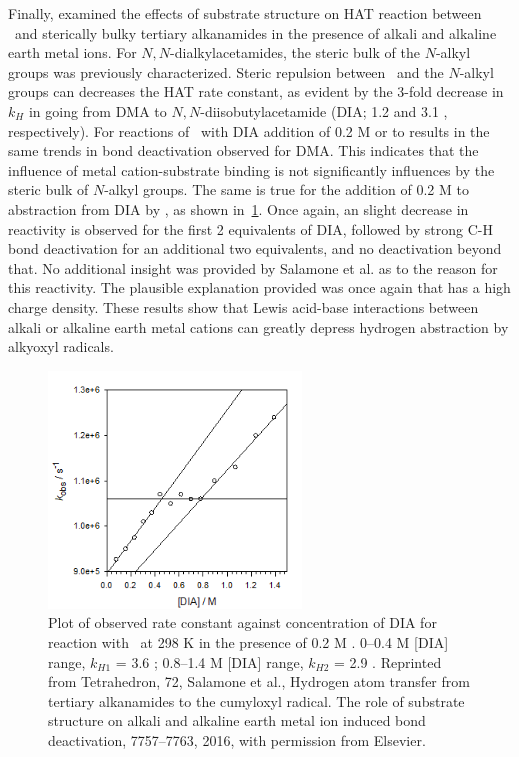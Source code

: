 Finally, \citet{Salamone2016} examined the effects of substrate structure on
HAT reaction between \cumo\ and sterically bulky tertiary alkanamides in the
presence of alkali and alkaline earth metal ions. For $N,N$-dialkylacetamides,
the steric bulk of the $N$-alkyl groups was previously
characterized.\cite{Salamone2014} Steric repulsion between \cumo\ and the
$N$-alkyl groups can decreases the HAT rate constant, as evident by the 3-fold
decrease in $k_H$ in going from DMA to $N,N$-diisobutylacetamide (DIA; 1.2
and 3.1 \Ms, respectively). For reactions of \cumo\ with DIA addition of
0.2 M  or  to results in the same trends in 
bond deactivation observed for DMA. This indicates that the influence of metal
cation-substrate binding is not significantly influences by the steric bulk of
$N$-alkyl groups.  The same is true for the addition of 0.2 M  to
abstraction from DIA by \cumo, as shown in~\ref{fig:k-dia-mg}. Once again, an
slight decrease in reactivity is observed for the first 2 equivalents of DIA,
followed by strong C-H bond deactivation for an additional two equivalents, and
no deactivation beyond that. No additional insight was provided by Salamone et
al. as to the reason for this reactivity. The plausible explanation provided
was once again that  has a high charge density. These results show
that Lewis acid-base interactions between alkali or alkaline earth metal
cations can greatly depress hydrogen abstraction by alkyoxyl radicals.

\begin{figure}[!htbp]
  \includegraphics[width=0.6\textwidth]{figures/exptdia-mg.png}
  \caption[Plot of observed rate constant against concentration of DIA for
  reaction with \cumo\ at 298 K in the presence of 0.2 M .]{Plot
	  of observed rate constant against concentration of DIA for reaction
	  with \cumo\ at 298 K in the presence of 0.2 M . 0--0.4
	  M [DIA] range, $k_{H1}$ = 3.6 \Ms; 0.8--1.4 M [DIA] range,
	  $k_{H2}$ = 2.9 \Ms.  Reprinted from Tetrahedron, 72, Salamone et
  al., Hydrogen atom transfer from tertiary alkanamides to the cumyloxyl
  radical. The role of substrate structure on alkali and alkaline earth metal
  ion induced  bond deactivation, 7757--7763, 2016, with permission
  from Elsevier.} \label{fig:k-dia-mg}
\end{figure}

